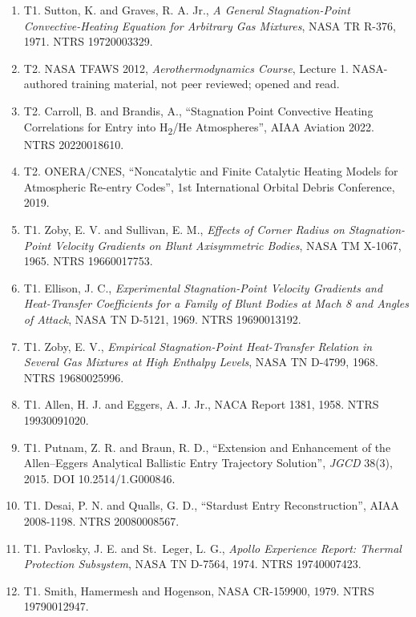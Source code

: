 \documentclass[
  a4paper,
  11pt]{article}
\providecommand{\tightlist}{%
  \setlength{\itemsep}{0pt}\setlength{\parskip}{0pt}}
\newcommand{\tierok}{{\color{good}\ding{51}}}
\newcommand{\tiermid}{{\color{warn}\ding{108}}}
\begin{document}
\begin{enumerate}
\def\labelenumi{\arabic{enumi}.}
\tightlist
\item
  \tierok{} T1. Sutton, K. and Graves, R. A. Jr., \emph{A General
  Stagnation-Point Convective-Heating Equation for Arbitrary Gas
  Mixtures}, NASA TR R-376, 1971. NTRS 19720003329.
\item
  \tiermid{} T2. NASA TFAWS 2012, \emph{Aerothermodynamics Course},
  Lecture 1. NASA-authored training material, not peer reviewed; opened
  and read.
\item
  \tiermid{} T2. Carroll, B. and Brandis, A., ``Stagnation Point
  Convective Heating Correlations for Entry into H\textsubscript{2}/He
  Atmospheres'', AIAA Aviation 2022. NTRS 20220018610.
\item
  \tiermid{} T2. ONERA/CNES, ``Noncatalytic and Finite Catalytic Heating
  Models for Atmospheric Re-entry Codes'', 1st International Orbital
  Debris Conference, 2019.
\item
  \tierok{} T1. Zoby, E. V. and Sullivan, E. M., \emph{Effects of Corner
  Radius on Stagnation-Point Velocity Gradients on Blunt Axisymmetric
  Bodies}, NASA TM X-1067, 1965. NTRS 19660017753.
\item
  \tierok{} T1. Ellison, J. C., \emph{Experimental Stagnation-Point
  Velocity Gradients and Heat-Transfer Coefficients for a Family of
  Blunt Bodies at Mach 8 and Angles of Attack}, NASA TN D-5121, 1969.
  NTRS 19690013192.
\item
  \tierok{} T1. Zoby, E. V., \emph{Empirical Stagnation-Point
  Heat-Transfer Relation in Several Gas Mixtures at High Enthalpy
  Levels}, NASA TN D-4799, 1968. NTRS 19680025996.
\item
  \tierok{} T1. Allen, H. J. and Eggers, A. J. Jr., NACA Report 1381,
  1958. NTRS 19930091020.
\item
  \tierok{} T1. Putnam, Z. R. and Braun, R. D., ``Extension and
  Enhancement of the Allen--Eggers Analytical Ballistic Entry Trajectory
  Solution'', \emph{JGCD} 38(3), 2015. DOI 10.2514/1.G000846.
\item
  \tierok{} T1. Desai, P. N. and Qualls, G. D., ``Stardust Entry
  Reconstruction'', AIAA 2008-1198. NTRS 20080008567.
\item
  \tierok{} T1. Pavlosky, J. E. and St.~Leger, L. G., \emph{Apollo
  Experience Report: Thermal Protection Subsystem}, NASA TN D-7564,
  1974. NTRS 19740007423.
\item
  \tierok{} T1. Smith, Hamermesh and Hogenson, NASA CR-159900, 1979.
  NTRS 19790012947.

\end{enumerate}
\end{document}
